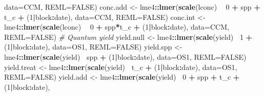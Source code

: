 \documentclass[]{scrartcl}
\newenvironment{Shaded}{\begin{snugshade}}{\end{snugshade}}
\newcommand{\CommentTok}[1]{\textcolor[rgb]{0.56,0.35,0.01}{\textit{#1}}}
\newcommand{\DataTypeTok}[1]{\textcolor[rgb]{0.13,0.29,0.53}{#1}}
\newcommand{\DecValTok}[1]{\textcolor[rgb]{0.00,0.00,0.81}{#1}}
\newcommand{\KeywordTok}[1]{\textcolor[rgb]{0.13,0.29,0.53}{\textbf{#1}}}
\newcommand{\NormalTok}[1]{#1}
\newcommand{\OperatorTok}[1]{\textcolor[rgb]{0.81,0.36,0.00}{\textbf{#1}}}
\newcommand{\OtherTok}[1]{\textcolor[rgb]{0.56,0.35,0.01}{#1}}
\newcommand{\StringTok}[1]{\textcolor[rgb]{0.31,0.60,0.02}{#1}}
\begin{document}
\begin{Shaded}
\begin{Highlighting}[]
{{{{{{{{{{{{                             \DataTypeTok{data=}\NormalTok{CCM, }\DataTypeTok{REML=}\OtherTok{FALSE}\NormalTok{)}
\NormalTok{    conc.add <-}\StringTok{ }\NormalTok{lme4}\OperatorTok{::}\KeywordTok{lmer}\NormalTok{(}\KeywordTok{scale}\NormalTok{(lconc) }\OperatorTok{~}\StringTok{ }\DecValTok{0} \OperatorTok{+}\StringTok{ }\NormalTok{spp }\OperatorTok{+}\StringTok{ }\NormalTok{t_c }\OperatorTok{+}\StringTok{ }\NormalTok{(}\DecValTok{1}\OperatorTok{|}\NormalTok{block}\OperatorTok{:}\NormalTok{date), }
                           \DataTypeTok{data=}\NormalTok{CCM, }\DataTypeTok{REML=}\OtherTok{FALSE}\NormalTok{)}
\NormalTok{    conc.int <-}\StringTok{ }\NormalTok{lme4}\OperatorTok{::}\KeywordTok{lmer}\NormalTok{(}\KeywordTok{scale}\NormalTok{(lconc) }\OperatorTok{~}\StringTok{ }\DecValTok{0} \OperatorTok{+}\StringTok{ }\NormalTok{spp}\OperatorTok{*}\NormalTok{t_c }\OperatorTok{+}\StringTok{ }\NormalTok{(}\DecValTok{1}\OperatorTok{|}\NormalTok{block}\OperatorTok{:}\NormalTok{date),}
                           \DataTypeTok{data=}\NormalTok{CCM, }\DataTypeTok{REML=}\OtherTok{FALSE}\NormalTok{)}
  \CommentTok{# Quantum yield}
\NormalTok{    yield.null <-}\StringTok{ }\NormalTok{lme4}\OperatorTok{::}\KeywordTok{lmer}\NormalTok{(}\KeywordTok{scale}\NormalTok{(yield)}\OperatorTok{~}\StringTok{ }\DecValTok{1} \OperatorTok{+}\StringTok{ }\NormalTok{(}\DecValTok{1}\OperatorTok{|}\NormalTok{block}\OperatorTok{:}\NormalTok{date), }
                             \DataTypeTok{data=}\NormalTok{OS1, }\DataTypeTok{REML=}\OtherTok{FALSE}\NormalTok{)}
\NormalTok{    yield.spp <-}\StringTok{ }\NormalTok{lme4}\OperatorTok{::}\KeywordTok{lmer}\NormalTok{(}\KeywordTok{scale}\NormalTok{(yield)}\OperatorTok{~}\StringTok{ }\NormalTok{spp }\OperatorTok{+}\StringTok{ }\NormalTok{(}\DecValTok{1}\OperatorTok{|}\NormalTok{block}\OperatorTok{:}\NormalTok{date), }
                            \DataTypeTok{data=}\NormalTok{OS1, }\DataTypeTok{REML=}\OtherTok{FALSE}\NormalTok{)}
\NormalTok{    yield.treat <-}\StringTok{ }\NormalTok{lme4}\OperatorTok{::}\KeywordTok{lmer}\NormalTok{(}\KeywordTok{scale}\NormalTok{(yield)}\OperatorTok{~}\StringTok{ }\NormalTok{t_c }\OperatorTok{+}\StringTok{ }\NormalTok{(}\DecValTok{1}\OperatorTok{|}\NormalTok{block}\OperatorTok{:}\NormalTok{date), }
                              \DataTypeTok{data=}\NormalTok{OS1, }\DataTypeTok{REML=}\OtherTok{FALSE}\NormalTok{)}
\NormalTok{    yield.add <-}\StringTok{ }\NormalTok{lme4}\OperatorTok{::}\KeywordTok{lmer}\NormalTok{(}\KeywordTok{scale}\NormalTok{(yield)}\OperatorTok{~}\StringTok{ }\DecValTok{0} \OperatorTok{+}\StringTok{ }\NormalTok{spp }\OperatorTok{+}\StringTok{ }\NormalTok{t_c }\OperatorTok{+}\StringTok{ }\NormalTok{(}\DecValTok{1}\OperatorTok{|}\NormalTok{block}\OperatorTok{:}\NormalTok{date), }
}}}}}}}}}}}}
\end{Highlighting}
\end{Shaded}
\end{document}
